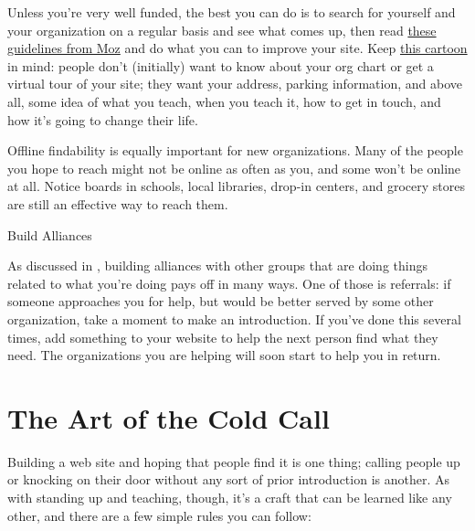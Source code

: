 Unless you're very well funded, the best you can do is to search for
yourself and your organization on a regular basis and see what comes
up, then read \href{https://moz.com/learn/seo/on-page-factors}{these
  guidelines from Moz} and do what you can to improve your site. Keep
\href{https://xkcd.com/773/}{this cartoon} in mind: people don't
(initially) want to know about your org chart or get a virtual tour of
your site; they want your address, parking information, and above all,
some idea of what you teach, when you teach it, how to get in touch,
and how it's going to change their life.

Offline findability is equally important for new organizations. Many
of the people you hope to reach might not be online as often as you,
and some won't be online at all.  Notice boards in schools, local
libraries, drop-in centers, and grocery stores are still an effective
way to reach them.

\begin{callout}{Build Alliances}

  As discussed in , building alliances with other
  groups that are doing things related to what you're doing pays off
  in many ways. One of those is referrals: if someone approaches you
  for help, but would be better served by some other organization,
  take a moment to make an introduction. If you've done this several
  times, add something to your website to help the next person find
  what they need. The organizations you are helping will soon start to
  help you in return.

\end{callout}

\newpage %

\section{The Art of the Cold Call}\label{s:marketing-cold-call}

Building a web site and hoping that people find it is one thing;
calling people up or knocking on their door without any sort of prior
introduction is another. As with standing up and teaching, though,
it's a craft that can be learned like any other, and there are a few
simple rules you can follow:

